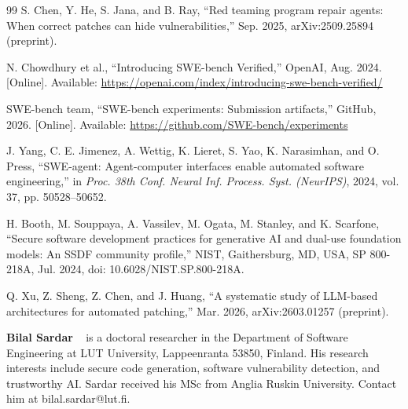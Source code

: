 \documentclass[10pt,journal,compsoc]{IEEEtran}
\begin{document}
\begin{thebibliography}{99}
S. Chen, Y. He, S. Jana, and B. Ray, ``Red teaming program repair agents:
When correct patches can hide vulnerabilities,'' Sep. 2025, arXiv:2509.25894
(preprint).

N. Chowdhury et al., ``Introducing SWE-bench Verified,'' OpenAI, Aug. 2024.
[Online]. Available: \url{https://openai.com/index/introducing-swe-bench-verified/}

SWE-bench team, ``SWE-bench experiments: Submission artifacts,'' GitHub, 2026.
[Online]. Available: \url{https://github.com/SWE-bench/experiments}

J. Yang, C. E. Jimenez, A. Wettig, K. Lieret, S. Yao, K. Narasimhan, and
O. Press, ``SWE-agent: Agent-computer interfaces enable automated software
engineering,'' in \emph{Proc. 38th Conf. Neural Inf. Process. Syst. (NeurIPS)},
2024, vol. 37, pp. 50528--50652.

H. Booth, M. Souppaya, A. Vassilev, M. Ogata, M. Stanley, and K. Scarfone,
``Secure software development practices for generative AI and dual-use
foundation models: An SSDF community profile,'' NIST, Gaithersburg, MD, USA,
SP 800-218A, Jul. 2024, doi: 10.6028/NIST.SP.800-218A.

Q. Xu, Z. Sheng, Z. Chen, and J. Huang, ``A systematic study of LLM-based
architectures for automated patching,'' Mar. 2026, arXiv:2603.01257 (preprint).

\end{thebibliography}

\raggedbottom
\makeatletter
\renewenvironment{IEEEbiographynophoto}[1]{%
  \par\addvspace{6pt plus 1pt minus 1pt}%
  \noindent\begin{minipage}{\columnwidth}\textbf{#1}%
  \normalfont\ }%
  {\par\end{minipage}\par}
\makeatother

\begin{IEEEbiographynophoto}{Bilal Sardar}
is a doctoral researcher in the Department of Software Engineering at LUT
University, Lappeenranta 53850, Finland. His research interests include secure
code generation, software vulnerability detection, and trustworthy AI. Sardar
received his MSc from Anglia Ruskin University. Contact him at
bilal.sardar@lut.fi.
\end{IEEEbiographynophoto}
\end{document}
